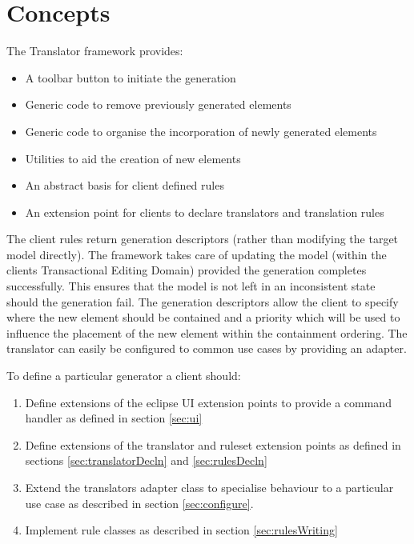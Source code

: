 \section{Concepts}
\label{sec:concepts}

The Translator framework provides:

\begin{itemize}
	\item A toolbar button to initiate the generation
	\item Generic code to remove previously generated elements
	\item Generic code to organise the incorporation of newly generated elements
	\item Utilities to aid the creation of new elements
	\item An abstract basis for client defined rules
	\item An extension point for clients to declare translators and translation rules
\end{itemize}

The client rules return generation descriptors (rather than modifying the target model directly). 
The framework takes care of updating the model (within the clients Transactional Editing Domain) provided the generation completes successfully. 
This ensures that the model is not left in an inconsistent state should the generation fail. 
The generation descriptors allow the client to specify where the new element should be contained and a priority which will be used to influence the placement of the new element within the containment ordering.
The translator can easily be configured to common use cases by providing an adapter.

To define a particular generator a client should:
\begin{enumerate}
	\item Define extensions of the eclipse UI extension points to provide a command handler as defined in section \ref{sec:ui}
	\item Define extensions of the translator and ruleset extension points as defined in sections \ref{sec:translatorDecln} and \ref{sec:rulesDecln} 
	\item Extend the translators adapter class to specialise behaviour to a particular use case as described in section \ref{sec:configure}.
	\item Implement rule classes as described in section \ref{sec:rulesWriting}
\end{enumerate}

